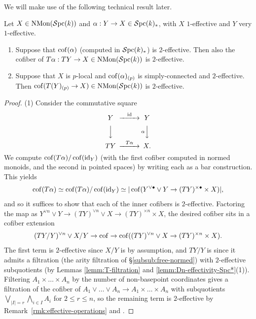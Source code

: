 \documentclass{amsart}
\numberwithin{proposition}{section}
\numberwithin{equation}{section}
\def\NMon{\mathrm{NMon}}
\begin{document}
We will make use of the following technical result later.
\begin{lemma} \label{lemm:2-eff-trick}
Let $X \in \NMon(\Spc(k))$ and $\alpha: Y \to X \in \mathcal{S}\mathrm{pc}{}(k)_*$, with $X$ $1$-effective and $Y$ very $1$-effective.
\begin{enumerate}
\item Suppose that $\operatorname{cof}(\alpha)$ (computed in $\mathcal{S}\mathrm{pc}{}(k)_*$) is $2$-effective.
  Then also the cofiber of $T\alpha: TY \to X \in \NMon(\Spc(k))$ is $2$-effective.
\item Suppose that $X$ is $p$-local and $\operatorname{cof}(\alpha)_{(p)}$ is simply-connected and $2$-effective.
  Then $\cof(T(Y)_{(p)} \to X) \in \NMon(\Spc(k))$ is $2$-effective.
\end{enumerate}
\end{lemma}
\begin{proof}
(1) Consider the commutative square
\begin{equation*}
\begin{CD}
Y @>{\id}>> Y \\
@VVV     @V{\alpha}VV \\
TY @>{T\alpha}>> X.
\end{CD}
\end{equation*}
We compute $\operatorname{cof}(T\alpha)/\operatorname{cof}(\operatorname{id}_Y)$ (with the first cofiber computed in normed monoids, and the second in pointed spaces) by writing each as a bar construction.
This yields \[ \operatorname{cof}(T\alpha) \simeq \operatorname{cof}(T\alpha)/\operatorname{cof}(\operatorname{id}_Y) \simeq |\operatorname{cof}(Y^{\vee \bullet} \vee Y \to (TY)^{\times \bullet} \times X)|, \] and so it suffices to show that each of the inner cofibers is $2$-effective.
Factoring the map as $Y^{\vee n} \vee Y \to (TY)^{\vee n} \vee X \to (TY)^{\times n} \times X$, the desired cofiber sits in a cofiber extension \[ (TY/Y)^{\vee n} \vee X/Y \to \operatorname{cof} \to \operatorname{cof}((TY)^{\vee n} \vee X \to (TY)^{\times n} \times X). \]
The first term is $2$-effective since $X/Y$ is by assumption, and $TY/Y$ is since it admits a filtration (the arity filtration of \S\ref{subsub:free-normed}) with $2$-effective subquotients (by Lemmas \ref{lemm:T-filtration} and \ref{lemm:Dn-effectivity-Spc*}(1)).
Filtering $A_1 \times \dots \times A_n$ by the number of non-basepoint coordinates gives a filtration of the cofiber of $A_1 \vee \dots \vee A_n \to A_1 \times \dots \times A_n$ with subquotients $\bigvee_{|I|=r}\bigwedge_{i\in I}A_i$ for $2\le r\le n$, so the remaining term is $2$-effective by Remark~\ref{rmk:effective-operations} and \cite[Theorem~3.1.20]{freudenthal}.


\end{proof}
\end{document}
